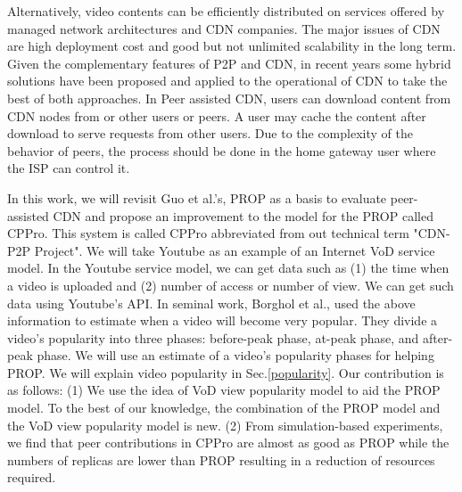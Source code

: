 Alternatively, video contents can be efficiently distributed on services offered by managed network architectures and CDN companies.
The major issues of CDN are high deployment cost and good but not unlimited scalability in the long term.  
Given the complementary features of P2P and CDN, in recent years some hybrid solutions have been proposed and applied to the operational of CDN \cite{Huang:2008:UHC:1496046.1496064,4772628,Yin:2009:DDH:1631272.1631279} to take the best of both approaches.
In Peer assisted CDN, users can download content from CDN nodes from or other users or peers. 
A user may cache the content after download to serve requests from other users. 
Due to the complexity of the behavior of peers, the process should be done in the home gateway user where the ISP can control it.

In this work, we will revisit Guo et al.'s, \cite{1613869} PROP as a basis to evaluate peer-assisted CDN and propose an improvement to the model for the PROP called CPPro.
This system is called CPPro abbreviated from out technical term "CDN-P2P Project".
We will take Youtube as an example of an Internet VoD service model.
In the Youtube service model, we can get data such as (1) the time when a video is uploaded and (2) number of access or number of view.
We can get such data using Youtube's API.
In seminal work, Borghol et al., \cite{Borghol:2011:CMP:2039452.2039717} used the above information to estimate when a video will become very popular.
They divide a video's popularity into three phases: before-peak phase, at-peak phase, and after-peak phase.
We will use an estimate of a video's popularity phases for helping PROP.
We will explain video popularity in Sec.\ref{popularity}.
Our contribution is as follows:
(1) We use the idea of VoD view popularity model to aid the PROP model. 
To the best of our knowledge, the combination of the PROP model and the VoD view popularity model is new.
(2) From simulation-based experiments, we find that peer contributions in CPPro are almost as good as  PROP while the numbers of replicas are lower than PROP resulting in a reduction of resources required.




